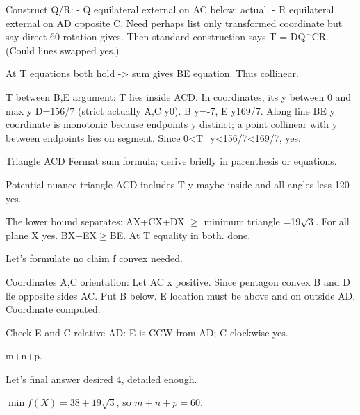 \begin{decodedreasoningpanel}
Construct Q/R:
- Q equilateral external on AC below: actual.
- R equilateral external on AD opposite C. Need perhaps list only transformed coordinate but say direct 60 rotation
  gives.
Then standard construction says T = DQ\ensuremath{\cap}CR. (Could lines swapped yes.)

At T equations both hold -\textgreater{} sum gives BE equation. Thus collinear.

T between B,E argument:
T lies inside ACD. In coordinates, its y between 0 and max y D=156/7 (strict actually A,C y0). B y=-7, E y169/7. Along line BE y coordinate is monotonic because endpoints y distinct; a point collinear with y between endpoints lies on segment. Since 0\textless{}T\_y\textless{}156/7\textless{}169/7, yes.

Triangle ACD Fermat sum formula; derive briefly in parenthesis or equations.

Potential nuance triangle ACD includes T y maybe inside and all angles less 120 yes.

The lower bound separates:
AX+CX+DX \ensuremath{\geq} minimum triangle =19\ensuremath{\sqrt{3}}. For all plane X yes.
BX+EX\ensuremath{\geq}BE.
At T equality in both. done.

Let's formulate no claim f convex needed.

Coordinates A,C orientation: Let AC x positive. Since pentagon convex B and D lie opposite sides AC. Put B below. E location must be above and on outside AD. Coordinate computed.

Check E and C relative AD: E is CCW from AD; C clockwise yes.

m+n+p.

Let's final answer desired 4, detailed enough.
\end{decodedreasoningpanel}
\begin{decodedanswerpanel}
$\min f(X){=}38{+}19\sqrt3$, so $m{+}n{+}p{=}60$.
\end{decodedanswerpanel}
